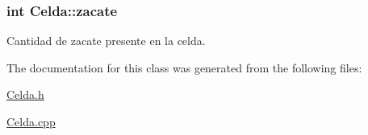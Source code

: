 \subsubsection[{\texorpdfstring{zacate}{zacate}}]{\setlength{\rightskip}{0pt plus 5cm}int Celda\+::zacate}\hypertarget{classCelda_ad5e9456beab1d6fbe306642fe7198043}{}\label{classCelda_ad5e9456beab1d6fbe306642fe7198043}


Cantidad de zacate presente en la celda. 



The documentation for this class was generated from the following files\+:\begin{DoxyCompactItemize}
\item 
\hyperlink{Celda_8h}{Celda.\+h}\item 
\hyperlink{Celda_8cpp}{Celda.\+cpp}\end{DoxyCompactItemize}
